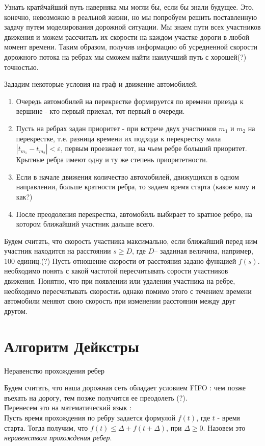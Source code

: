 \documentclass[12pt, a4paper]{article}
\begin{document}
Узнать кратйчайший путь наверняка мы могли бы, если бы знали будущее. Это, конечно, невозможно в реальной жизни, но мы попробуем решить поставленную задачу путем моделирования дорожной ситуации. Мы знаем пути всех участников движения и можем рассчитать их скорости на каждом участке дороги в любой момент времени. Таким образом, получив информацию об усредненной скорости дорожного потока на ребрах мы сможем найти наилучший путь с хорошей(?) точностью.

Зададим некоторые условия на граф и движение автомобилей. 

\begin{enumerate}
	\item Очередь автомобилей на перекрестке формируется по времени приезда к вершине - кто первый приехал, тот первый в очереди.
	\item Пусть на ребрах задан приоритет - при встрече двух участников $ m_1 $ и $ m_2 $ на перекрестке, т.е. разница времени их подхода к перекрестку мала $ | t_{m_1} - t_{m_2} | < \varepsilon $, первым проезжает тот, на чьем ребре больший приоритет. Крытные ребра имеют одну и ту же степень приоритетности. 
	\item Если в начале движения количество автомобилей, движущихся в одном направлении, больше кратности ребра, то задаем время старта (какое кому и как?)
	\item После преодоления перекрестка, автомобиль выбирает то кратное ребро, на котором ближайший участник дальше всего.
\end{enumerate}

Будем считать, что скорость участника максимально, если ближайший перед ним участник находится на расстоянии $ s \geq D $, где $ D $-- заданная величина, например, 100 единиц.(?) Пусть отношение скорости от расстояния задано функцией $ f(s) $. необходимо понять с какой частотой пересчитывать сорости участников движения. Понятно, что при появлении или удалении участника на ребре, необходимо пересчитывать скоростиь однако помимо этого с течением времени автомобили меняют свою скорость при изменении расстоянии между друг другом.




\newpage
\section*{Алгоритм Дейкстры}

$\textbf{Неравенство прохождения ребер}$

Будем считать, что наша дорожная сеть обладает условием FIFO : чем позже въехать на дорогу, тем позже получится ее преодолеть (?).\\
Перенесем это на математический язык : \\
Пусть время прохождения по ребру задается формулой $f(t)$, где $t$ - время старта. Тогда получим, что $f(t) \le \Delta + f(t + \Delta)$, при $\Delta \ge 0$. Назовем это \textit{неравенством прохождения ребер}.
\end{document}
